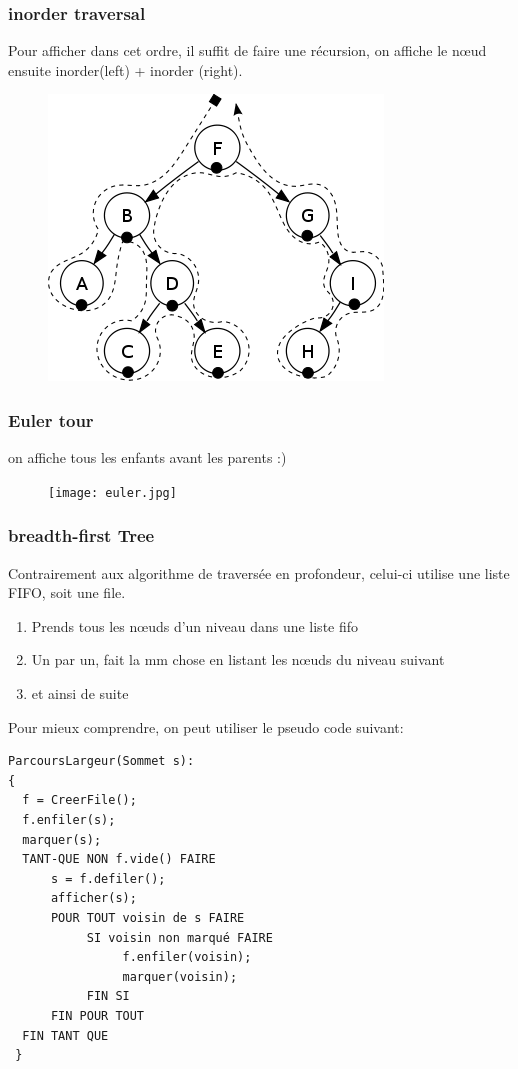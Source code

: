 \documentclass[a4paper]{article}
\begin{document}
\subsubsection{inorder traversal}
Pour afficher dans cet ordre, il suffit de faire une récursion, on affiche le nœud ensuite inorder(left) + inorder (right).

\begin{figure}[!h]
\begin{center}
\includegraphics[scale=0.4]{inorder.png}
\end{center}
\end{figure}


\subsubsection{Euler tour}
on affiche tous les enfants avant les parents :)
\begin{center}
\begin{figure}[!h]
\texttt{[image: euler.jpg]}
\end{figure}
\end{center}

\subsubsection{breadth-first Tree}
Contrairement aux algorithme de traversée en profondeur, celui-ci utilise une liste FIFO, soit une file. \\
\begin{enumerate}
\item Prends tous les nœuds d'un niveau dans une liste fifo
\item Un par un, fait la mm chose en listant les nœuds du niveau suivant
\item et ainsi de suite
\end{enumerate}
Pour mieux comprendre, on peut utiliser le pseudo code suivant:
\begin{verbatim}
ParcoursLargeur(Sommet s):
{
  f = CreerFile();
  f.enfiler(s);
  marquer(s);
  TANT-QUE NON f.vide() FAIRE
      s = f.defiler();
      afficher(s);    
      POUR TOUT voisin de s FAIRE
           SI voisin non marqué FAIRE
                f.enfiler(voisin);
                marquer(voisin);
           FIN SI
      FIN POUR TOUT 
  FIN TANT QUE       
 }
\end{verbatim}
\end{document}
